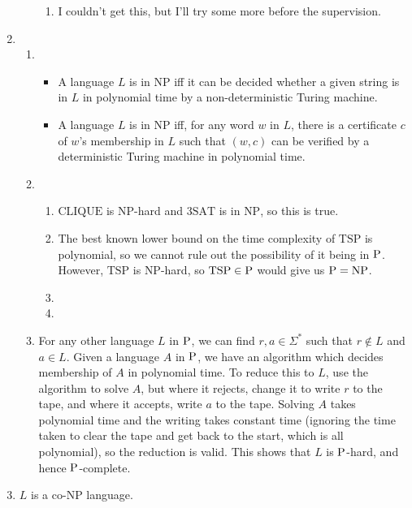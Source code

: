 \documentclass{article}
\begin{document}
\begin{enumerate}
\begin{enumerate}[label=\arabic{enumii}.]
\begin{enumerate}[label=(\alph{enumiii})]
          \item I couldn't get this, but I'll try some more before the supervision.
        \end{enumerate}
    \end{enumerate}
  \item
    \begin{enumerate}
      \item
        \begin{itemize}
          \item A language $L$ is in $\textrm{NP}$ iff it can be decided whether a given string is in $L$ in polynomial time by a non-deterministic Turing machine.
          \item A language $L$ is in $\textrm{NP}$ iff, for any word $w$ in $L$, there is a certificate $c$ of $w$'s membership in $L$ such that $(w,c)$ can be verified by a deterministic Turing machine in polynomial time.
        \end{itemize}
      \item
        \begin{enumerate}
          \item $\textrm{CLIQUE}$ is $\textrm{NP}$-hard and $\textrm{3SAT}$ is in $\textrm{NP}$, so this is true.
          \item The best known lower bound on the time complexity of $\textrm{TSP}$ is polynomial, so we cannot rule out the possibility of it being in $\textrm P$. However, $\textrm{TSP}$ is $\textrm{NP}$-hard, so $\textrm{TSP} \in \textrm P$ would give us $\textrm P = \textrm{NP}$.
          \item 
          \item 
        \end{enumerate}
      \item For any other language $L$ in $\textrm P$, we can find $r,a \in \Sigma^*$ such that $r \notin L$ and $a \in L$. Given a language $A$ in $\textrm P$, we have an algorithm which decides membership of $A$ in polynomial time. To reduce this to $L$, use the algorithm to solve $A$, but where it rejects, change it to write $r$ to the tape, and where it accepts, write $a$ to the tape. Solving $A$ takes polynomial time and the writing takes constant time (ignoring the time taken to clear the tape and get back to the start, which is all polynomial), so the reduction is valid. This shows that $L$ is $\textrm P$-hard, and hence $\textrm P$-complete.
    \end{enumerate}
  \item
    $L$ is a $\textrm{co-NP}$ language.


\end{enumerate}
\end{document}
